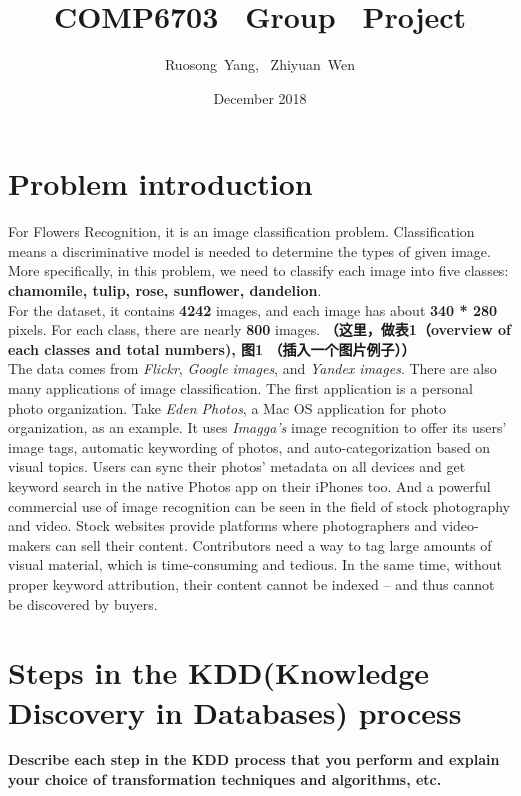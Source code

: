 \documentclass{article}
\title{COMP6703 \ Group \ Project}
\author{Ruosong\ Yang, \ Zhiyuan\  Wen}
\date{December 2018}
\begin{document}
\maketitle

\section{Problem introduction}
\noindent
For Flowers Recognition, it is an image classification problem. Classification means a discriminative model is needed to determine the types of given image. More specifically, in this problem, we need to classify each image into five classes: \textbf{chamomile, tulip, rose, sunflower, dandelion}. \\

\noindent
For the dataset, it contains \textbf{4242} images, and each image has about \textbf{340 * 280} pixels. For each class, there are nearly \textbf{800} images. \textbf{（这里，做表1（overview of each classes and total numbers), 图1 （插入一个图片例子））}\\
\noindent
The data comes from \textit{Flickr}, \textit{Google images}, and \textit{Yandex images}.
There are also many applications of image classification. The first application is a personal photo organization. Take \textit{Eden Photos}, a Mac OS application for photo organization, as an example. It uses \textit{Imagga’s} image recognition to offer its users' image tags, automatic keywording of photos, and auto-categorization based on visual topics. Users can sync their photos’ metadata on all devices and get keyword search in the native Photos app on their iPhones too. And a powerful commercial use of image recognition can be seen in the field of stock photography and video. Stock websites provide platforms where photographers and video-makers can sell their content. Contributors need a way to tag large amounts of visual material, which is time-consuming and tedious. In the same time, without proper keyword attribution, their content cannot be indexed – and thus cannot be discovered by buyers.


\section{Steps in the KDD(Knowledge Discovery in Databases) process}
\noindent
\textbf{Describe each step in the KDD process that you perform and explain your choice of transformation techniques and algorithms, etc.}\\
\end{document}
